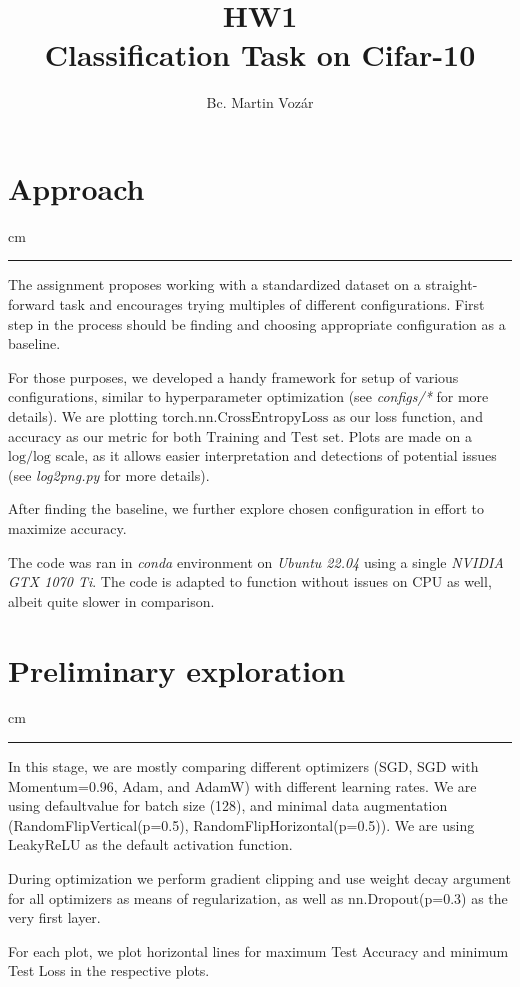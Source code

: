 \documentclass[12pt,a4paper]{article}
\date{}
\title{HW1 \\ Classification Task on Cifar-10}
\author{Bc. Martin Vozár}
\newcommand {\sectionrule}{\vskip -0.9 cm
\color {mygray} \rule [0 cm] {17 cm}{0.1 mm} \color {black}}
\begin{document}
\maketitle

\section{Approach}
\sectionrule

The assignment proposes working with a standardized dataset on a 
straight-forward task and encourages trying multiples of different
configurations. First step in the process should be finding and choosing
appropriate configuration as a baseline.

For those purposes, we developed a handy framework for setup
of various configurations, similar to hyperparameter optimization
(see \emph{configs/*} for more details).
We are plotting $\text{torch.nn.CrossEntropyLoss}$ as our loss function,
and accuracy as our metric for both $\text{Training}$ and $\text{Test set}$.
Plots are made on a $\text{log}/\text{log}$
scale, as it allows easier interpretation and detections of potential
issues (see \emph{log2png.py} for more details).

After finding the baseline, we further explore chosen configuration
in effort to maximize accuracy.

The code was ran in \emph{conda} environment on \emph{Ubuntu 22.04} using
a single \emph{NVIDIA GTX 1070 Ti}. The code is adapted to function
without issues on CPU as well, albeit quite slower in comparison.

\section{Preliminary exploration}
\sectionrule

In this stage, we are mostly comparing different optimizers 
(SGD, SGD with Momentum=0.96, Adam, and AdamW) with
different learning rates. We are using defaultvalue for batch size
(128), and minimal data augmentation (RandomFlipVertical(p=0.5),
RandomFlipHorizontal(p=0.5)). We are using LeakyReLU as the default
activation function.

During optimization we perform gradient clipping and use
weight decay argument for all optimizers as means of regularization,
as well as nn.Dropout(p=0.3) as the very first layer. 

For each plot, we plot horizontal lines for maximum Test Accuracy
and minimum Test Loss in the respective plots.
\end{document}
